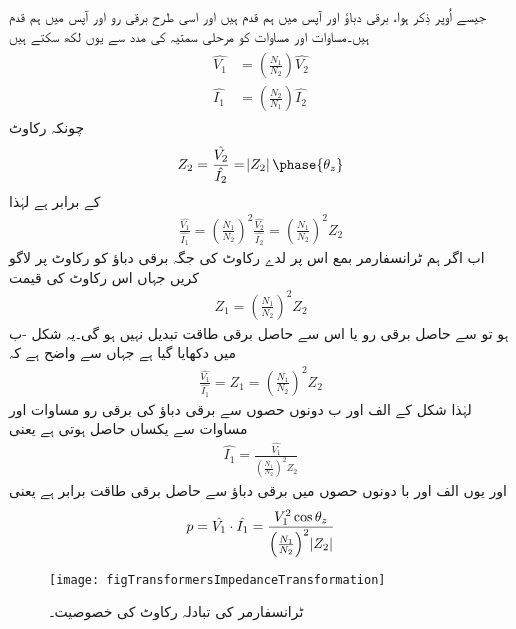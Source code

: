 جیسے اُوپر ذِکر ہوا، برقی دباؤ  اور  آپس میں ہم قدم ہیں اور  اسی طرح برقی رو  اور  آپس میں  ہم قدم ہیں۔مساوات  اور  مساوات    کو مرحلی سمتیہ کی مدد سے یوں لکھ سکتے ہیں
\begin{gather}
\begin{aligned}
\hat{V_1}&=\left(\frac{N_1}{N_2} \right) \hat{V_2}\\
\hat{I_1}&=\left(\frac{N_2}{N_1} \right) \hat{I_2}
\end{aligned}
\end{gather}
چونکہ رکاوٹ
\begin{align}
Z_2=\frac{\hat{V_2}}{\hat{I_2}}=\abs{Z_2}\phase{\theta_z}
\end{align}
کے برابر ہے لہٰذا
\begin{align}\label{مساوات_ٹرانسفارمر_تبادلہ_رکاوٹ_الف}
\frac{\hat{V_1}}{\hat{I_1}}=\left(\frac{N_1}{N_2} \right)^2 \frac{\hat{V_2}}{\hat{I_2}}=\left(\frac{N_1}{N_2} \right)^2  Z_2
\end{align}
اب اگر ہم ٹرانسفارمر بمع اس پر لدے رکاوٹ  کی جگہ برقی دباؤ  کو رکاوٹ  پر لاگو کریں جہاں اس رکاوٹ کی قیمت
\begin{align}\label{مساوات_ٹرانسفارمر_متبادل_رکاوٹ_تعریف}
Z_1=\left(\frac{N_1}{N_2} \right)^2  Z_2
\end{align}
ہو تو  سے حاصل برقی رو یا اس سے حاصل برقی طاقت تبدیل نہیں ہو گی۔یہ شکل -ب میں دکھایا گیا ہے جہاں سے واضح ہے کہ
\begin{align}\label{مساوات_ٹرانسفارمر_تبادلہ_رکاوٹ_ب}
\frac{\hat{V_1}}{\hat{I_1}}=Z_1=\left(\frac{N_1}{N_2} \right)^2  Z_2
\end{align}
لہٰذا شکل کے الف اور ب دونوں حصوں سے  برقی دباؤ  کی برقی رو مساوات   اور مساوات   سے یکساں حاصل ہوتی ہے یعنی
\begin{align}
\hat{I_1}=\frac{\hat{V_1}}{\left(\frac{N_1}{N_2} \right)^2  Z_2}
\end{align}
اور یوں الف اور با  دونوں حصوں میں  برقی دباؤ  سے حاصل برقی طاقت برابر ہے یعنی
\begin{align}
p=\hat{V_1} \cdot \hat{I_1}=\frac{V_1^2 \cos \theta_z}{\left(\frac{N_1}{N_2} \right)^2  \abs{Z_2}}
\end{align}
%
\begin{figure}
\centering
\texttt{[image: figTransformersImpedanceTransformation]}
\caption{ٹرانسفارمر کی تبادلہ رکاوٹ کی خصوصیت۔}
\label{شکل_ٹرانسفارمر_رکاوٹ_کا_تبادلہ}
\end{figure}
